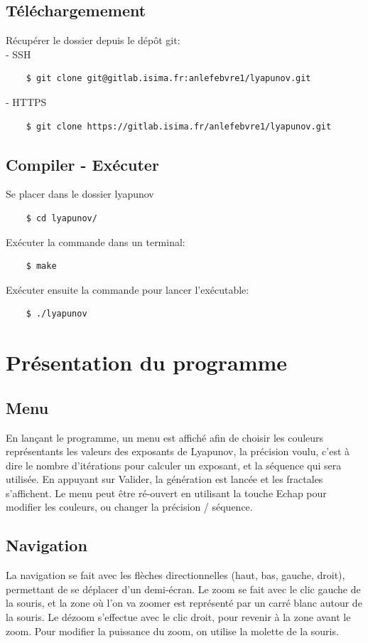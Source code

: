 \documentclass{article}
\begin{document}
	\subsection{Téléchargemement}
	\noindent Récupérer le dossier depuis le dépôt git:\\
	- SSH
	\begin{lstlisting}
	$ git clone git@gitlab.isima.fr:anlefebvre1/lyapunov.git
	\end{lstlisting}
	- HTTPS
	\begin{lstlisting}
	$ git clone https://gitlab.isima.fr/anlefebvre1/lyapunov.git
	\end{lstlisting}
	\subsection{Compiler - Exécuter}
	\noindent Se placer dans le dossier lyapunov
	\begin{lstlisting}
	$ cd lyapunov/
	\end{lstlisting}
	Exécuter la commande dans un terminal: \newline
	\begin{lstlisting}
	$ make
	\end{lstlisting}
	Exécuter ensuite la commande pour lancer l'exécutable:\newline
	\begin{lstlisting}
	$ ./lyapunov
	\end{lstlisting}

	\section{Présentation du programme}
	\subsection{Menu}
	En lançant le programme, un menu est affiché afin de choisir les couleurs représentants les valeurs des exposants de Lyapunov, la précision voulu, c'est à dire le nombre d'itérations pour calculer un exposant, et la séquence qui sera utilisée.
	En appuyant sur Valider, la génération est lancée et les fractales s'affichent.
	Le menu peut être ré-ouvert en utilisant la touche Echap pour modifier les couleurs, ou changer la précision / séquence.
	\subsection{Navigation}
	La navigation se fait avec les flèches directionnelles (haut, bas, gauche, droit), permettant de se déplacer d'un demi-écran.
	Le zoom se fait avec le clic gauche de la souris, et la zone où l'on va zoomer est représenté par un carré blanc autour de la souris.
	Le dézoom s'effectue avec le clic droit, pour revenir à la zone avant le zoom.
	Pour modifier la puissance du zoom, on utilise la molette de la souris.
\end{document}

